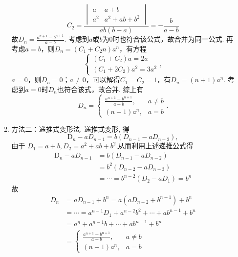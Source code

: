 \begin{enumerate}
\begin{enumerate}
\[                        C_2=\frac{\begin{vmatrix}
                                a   & a+b        \\
                                a^2 & a^2+ab+b^2
                            \end{vmatrix}}{ab(b-a)}=-\frac{b}{a-b}\]
                    故$D_n=\displaystyle\frac{a^{n+1}-b^{n+1}}{a-b}$. 考虑到$a$或$b$为0时也符合该公式，故合并为同一公式. 再考虑$a=b$，则$D_n=(C_1+C_2n)a^n$，有方程
                    \[\begin{cases}
                            (C_1+C_2)a=2a \\
                            (C_1+2C_2)a^2=3a^2
                        \end{cases},\]
                    $a=0$，则$D_n=0$；$a\neq 0$，可以解得$C_1=C_2=1$，有$D_n=(n+1)a^n$. 考虑到$a=0$时$D_n$也符合该式，故合并. 综上有
                    \[D_n=\begin{cases}
                            \displaystyle\frac{a^{n+1}-b^{n+1}}{a-b}, & a\neq b \\
                            (n+1)a^n,                                 & a=b
                        \end{cases}.\]

              \item 方法二：递推式变形法. 递推式变形, 得
                    \[\mathrm{D}_{n}-a D_{n-1}=b\left(D_{n-1}-a D_{n-2}\right),\]
                    由于 $D_{1}=a+b, D_{2}=a^{2}+a b+b^{2}$,从而利用上述递推公式得
                    \begin{align*}
                        \mathrm{D}_{n}-a D_{n-1} & =b\left(D_{n-1}-a D_{n-2}\right)                \\
                                                 & =b^{2}\left(D_{n-2}-a D_{n-3}\right)            \\
                                                 & =\cdots=b^{n-2}\left(D_{2}-a D_{1}\right)=b^{n}
                    \end{align*}
                    故\begin{align*}
                        D_{n} & =a D_{n-1}+b^{n}=a\left(a D_{n-2}+b^{n-1}\right)+b^{n}     \\
                              & =\cdots=a^{n-1} D_{1}+a^{n-2} b^{2}+\cdots+a b^{n-1}+b^{n} \\
                              & =a^{n}+a^{n-1} b+\cdots+a b^{n-1}+b^{n}                    \\
                              & =\begin{cases}
                                     \displaystyle\frac{a^{n+1}-b^{n+1}}{a-b}, & a\neq b \\
                                     (n+1)a^n,                                 & a=b
                                 \end{cases}
                    \end{align*}
          \end{enumerate}


\end{enumerate}
